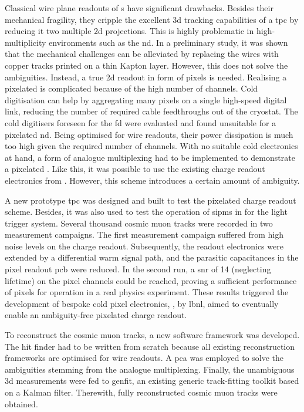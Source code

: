 Classical wire plane readouts of \lartpc{}s have significant drawbacks.
Besides their mechanical fragility, they cripple the excellent \gls{3d} tracking capabilities of a \gls{tpc} by reducing it two multiple \gls{2d} projections.
This is highly problematic in high-multiplicity environments such as the \dune{} \gls{nd}.
In a preliminary study, it was shown that the mechanical challenges can be alleviated by replacing the wires with copper tracks printed on a thin Kapton layer.
However, this does not solve the ambiguities.
Instead, a true \gls{2d} readout in form of pixels is needed.
Realising a pixelated \lartpc{} is complicated because of the high number of channels.
Cold digitisation can help by aggregating many pixels on a single high-speed digital link, reducing the number of required cable feedthroughs out of the cryostat.
The cold digitisers foreseen for the \dune{} \gls{fd} were evaluated and found unsuitable for a pixelated \gls{nd}.
Being optimised for wire readouts, their power dissipation is much too high given the required number of channels.
With no suitable cold electronics at hand, a form of analogue multiplexing had to be implemented to demonstrate a pixelated \lartpc{}.
Like this, it was possible to use the existing charge readout electronics from \AT{}.
However, this scheme introduces a certain amount of ambiguity.

A new prototype \gls{tpc} was designed and built to test the pixelated charge readout scheme.
Besides, it was also used to test the operation of \glspl{sipm} in \lar{} for the light trigger system.
Several thousand cosmic muon tracks were recorded in two measurement campaigns.
The first measurement campaign suffered from high noise levels on the charge readout.
Subsequently, the \AT{} readout electronics were extended by a differential warm signal path, and the parasitic capacitances in the pixel readout \gls{pcb} were reduced.
In the second run, a \gls{snr} of \num{14} (neglecting lifetime) on the pixel channels could be reached, proving a sufficient performance of pixels for operation in a real physics experiment.
These results triggered the development of bespoke cold pixel electronics, \larpix{}, by \gls{lbnl}, aimed to eventually enable an ambiguity-free pixelated \lartpc{} charge readout.

To reconstruct the cosmic muon tracks, a new software framework was developed.
The hit finder had to be written from scratch because all existing \lartpc{} reconstruction frameworks are optimised for wire readouts.
A \gls{pca} was employed to solve the ambiguities stemming from the analogue multiplexing.
Finally, the unambiguous \gls{3d} measurements were fed to \gls{genfit}, an existing generic track-fitting toolkit based on a Kalman filter.
Therewith, fully reconstructed cosmic muon tracks were obtained.

